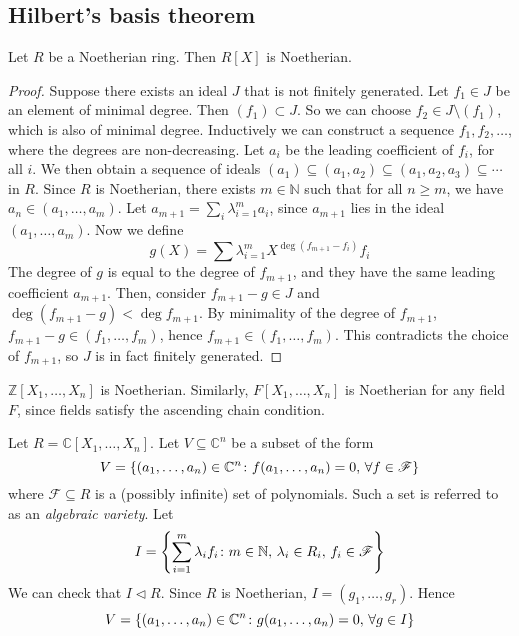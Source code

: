 \subsection{Hilbert's basis theorem}
\begin{theorem}
	Let \( R \) be a Noetherian ring.
	Then \( R[X] \) is Noetherian.
\end{theorem}
\begin{proof}
	Suppose there exists an ideal \( J \) that is not finitely generated.
	Let \( f_1 \in J \) be an element of minimal degree.
	Then \( (f_1) \subset J \).
	So we can choose \( f_2 \in J \setminus (f_1) \), which is also of minimal degree.
	Inductively we can construct a sequence \( f_1, f_2, \dots \), where the degrees are non-decreasing.
	Let \( a_i \) be the leading coefficient of \( f_i \), for all \( i \).
	We then obtain a sequence of ideals \( (a_1) \subseteq (a_1, a_2) \subseteq (a_1, a_2, a_3) \subseteq \cdots \) in \( R \).
	Since \( R \) is Noetherian, there exists \( m \in \mathbb N \) such that for all \( n \geq m \), we have \( a_{n} \in (a_1, \dots, a_m) \).
	Let \( a_{m+1} = \sum_i \lambda_{i=1}^m a_i \), since \( a_{m+1} \) lies in the ideal \( (a_1, \dots, a_m) \).
	Now we define
	\[
		g(X) = \sum \lambda_{i=1}^m X^{\deg (f_{m+1} - f_i)} f_i
	\]
	The degree of \( g \) is equal to the degree of \( f_{m+1} \), and they have the same leading coefficient \( a_{m+1} \).
	Then, consider \( f_{m+1} - g \in J \) and \( \deg (f_{m+1} - g) < \deg f_{m+1} \).
	By minimality of the degree of \( f_{m+1} \), \( f_{m+1} - g \in (f_1, \dots, f_m) \), hence \( f_{m+1} \in (f_1, \dots, f_m) \).
	This contradicts the choice of \( f_{m+1} \), so \( J \) is in fact finitely generated.
\end{proof}
\begin{corollary}
	\( \mathbb Z[X_1, \dots, X_n] \) is Noetherian.
	Similarly, \( F[X_1, \dots, X_n] \) is Noetherian for any field \( F \), since fields satisfy the ascending chain condition.
\end{corollary}
\begin{example}
	Let \( R = \mathbb C[X_1, \dots, X_n] \).
	Let \( V \subseteq \mathbb C^n \) be a subset of the form
	\[
		V = \qty{(a_1, \dots, a_n) \in \mathbb C^n \colon f(a_1, \dots, a_n) = 0,\,\forall f \in \mathscr F}
	\]
	where \( \mathscr F \subseteq R \) is a (possibly infinite) set of polynomials.
	Such a set is referred to as an \textit{algebraic variety}.
	Let
	\[
		I = \qty{\sum_{i=1}^m \lambda_i f_i \colon m \in \mathbb N,\, \lambda_i \in R_i,\, f_i \in \mathscr F}
	\]
	We can check that \( I \triangleleft R \).
	Since \( R \) is Noetherian, \( I = (g_1, \dots, g_r) \).
	Hence
	\[
		V = \qty{(a_1, \dots, a_n) \in \mathbb C^n \colon g(a_1, \dots, a_n) = 0,\,\forall g \in I}
	\]
\end{example}
